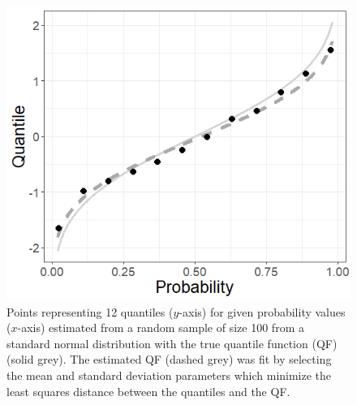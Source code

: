 \begin{figure}[hbt!]
    \centering
    \includegraphics[scale=.5]{Images/fit_quantiles_example.png}
    \caption{Points representing 12 quantiles ($y$-axis) for given probability 
    values ($x$-axis) estimated from a random sample of size 100 from a 
    standard normal distribution with the true quantile function (QF) 
    (solid grey). The estimated QF (dashed grey) was fit by selecting the mean 
    and standard deviation 
    parameters which minimize the least squares distance between the quantiles 
    and the QF.}
    \label{fig:quant_match_example}
\end{figure}

